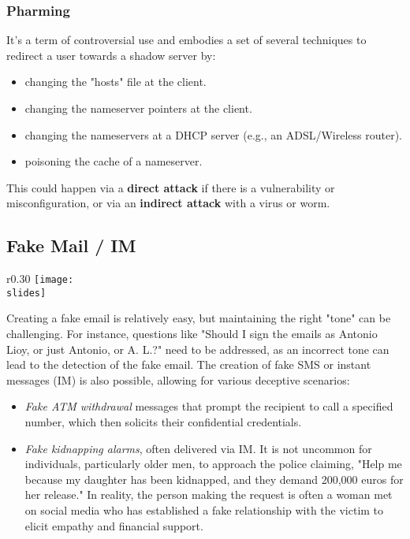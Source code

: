 \subsubsection{Pharming}
It's a term of controversial use and embodies a set of several techniques to redirect a user towards a shadow server by:
\begin{itemize}
  \item changing the "hosts" file at the client.
  \item changing the nameserver pointers at the client.
  \item changing the nameservers at a DHCP server (e.g., an ADSL/Wireless router).
  \item poisoning the cache of a nameserver.
\end{itemize}
This could happen via a \textbf{direct attack} if there is a vulnerability or misconfiguration, or via an \textbf{indirect attack} with a virus or worm.


\subsection{Fake Mail / IM}
\begin{wrapfigure}{r}{0.30\textwidth}
  \centering
  \texttt{[image: \\slides]}
\end{wrapfigure}
Creating a fake email is relatively easy, but maintaining the right "tone" can be challenging. For instance, questions like "Should I sign the emails as Antonio Lioy, or just Antonio, or A. L.?" need to be addressed, as an incorrect tone can lead to the detection of the fake email. The creation of fake SMS or instant messages (IM) is also possible, allowing for various deceptive scenarios:
\begin{itemize}
  \item \emph{Fake ATM withdrawal} messages that prompt the recipient to call a specified number, which then solicits their confidential credentials.
  \item \emph{Fake kidnapping alarms}, often delivered via IM. It is not uncommon for individuals, particularly older men, to approach the police claiming, "Help me because my daughter has been kidnapped, and they demand 200,000 euros for her release." In reality, the person making the request is often a woman met on social media who has established a fake relationship with the victim to elicit empathy and financial support.
\end{itemize}



